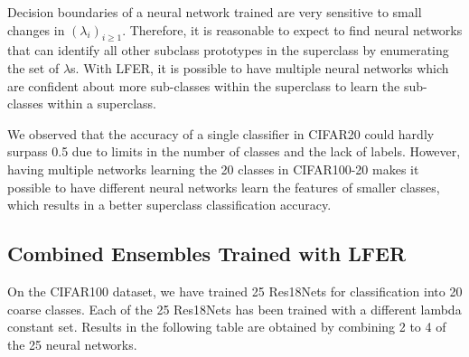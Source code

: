 \documentclass[journal]{journal}
\begin{document}
Decision boundaries of a neural network trained are very sensitive to small changes in $(\lambda_{i})_{i \geq 1}$. Therefore, it is reasonable to expect to find neural networks that can identify all other subclass prototypes in the superclass by enumerating the set of $\lambda$s. With LFER, it is possible to have multiple neural networks which are confident about more sub-classes within the superclass to learn the sub-classes within a superclass. 

We observed that the accuracy of a single classifier in CIFAR20 could hardly surpass 0.5 due to limits in the number of classes and the lack of labels. However, having multiple networks learning the 20 classes in CIFAR100-20 makes it possible to have different neural networks learn the features of smaller classes, which results in a better superclass classification accuracy.

\subsection{Combined Ensembles Trained with LFER}
On the CIFAR100 dataset, we have trained 25 Res18Nets for classification into 20 coarse classes. Each of the 25 Res18Nets has been trained with a different lambda constant set. Results in the following table are obtained by combining 2 to 4 of the 25 neural networks. 
\end{document}

